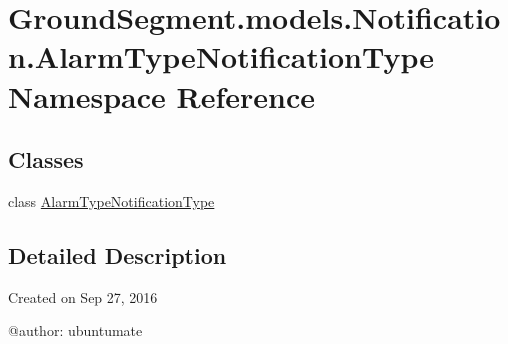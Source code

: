 \hypertarget{namespace_ground_segment_1_1models_1_1_notification_1_1_alarm_type_notification_type}{}\section{Ground\+Segment.\+models.\+Notification.\+Alarm\+Type\+Notification\+Type Namespace Reference}
\label{namespace_ground_segment_1_1models_1_1_notification_1_1_alarm_type_notification_type}
\subsection*{Classes}
\begin{DoxyCompactItemize}
\item 
class \hyperlink{class_ground_segment_1_1models_1_1_notification_1_1_alarm_type_notification_type_1_1_alarm_type_notification_type}{Alarm\+Type\+Notification\+Type}
\end{DoxyCompactItemize}


\subsection{Detailed Description}
\begin{DoxyVerb}Created on Sep 27, 2016

@author: ubuntumate
\end{DoxyVerb}
 